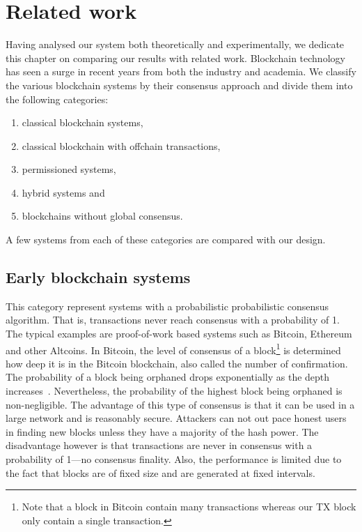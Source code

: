 \chapter{Related work}
\label{ch:related}

Having analysed our system both theoretically and experimentally,
we dedicate this chapter on comparing our results with related work.
Blockchain technology has seen a surge in recent years from both the industry and academia.
We classify the various blockchain systems by their consensus approach and divide them into the following categories: 
\begin{enumerate}
    \item classical blockchain systems,
    \item classical blockchain with offchain transactions,
    \item permissioned systems,
    \item hybrid systems and
    \item blockchains without global consensus.
\end{enumerate}
A few systems from each of these categories are compared with our design.

\section{Early blockchain systems}
This category represent systems with a probabilistic probabilistic consensus algorithm.
That is, transactions never reach consensus with a probability of 1.
The typical examples are proof-of-work based systems such as Bitcoin, Ethereum and other Altcoins.
In Bitcoin, the level of consensus of a block\footnote{Note that a block in Bitcoin contain many transactions whereas our TX block only contain a single transaction.}
is determined how deep it is in the Bitcoin blockchain, also called the number of confirmation.
The probability of a block being orphaned drops exponentially as the depth increases~\cite{bitcoin}.
Nevertheless, the probability of the highest block being orphaned is non-negligible.
The advantage of this type of consensus is that it can be used in a large network and is reasonably secure.
Attackers can not out pace honest users in finding new blocks unless they have a majority of the hash power.
The disadvantage however is that transactions are never in consensus with a probability of 1---no consensus finality.
Also, the performance is limited due to the fact that blocks are of fixed size and are generated at fixed intervals.

